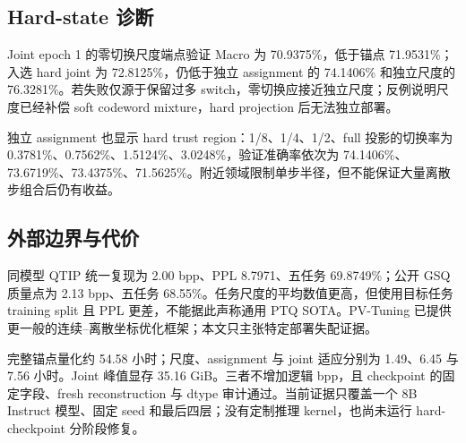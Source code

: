 \subsection{Hard-state 诊断}
Joint epoch 1 的零切换尺度端点验证 Macro 为 70.9375\%，低于锚点 71.9531\%；入选 hard joint 为 72.8125\%，仍低于独立 assignment 的 74.1406\% 和独立尺度的 76.3281\%。若失败仅源于保留过多 switch，零切换应接近独立尺度；反例说明尺度已经补偿 soft codeword mixture，hard projection 后无法独立部署。

独立 assignment 也显示 hard trust region：1/8、1/4、1/2、full 投影的切换率为 0.3781\%、0.7562\%、1.5124\%、3.0248\%，验证准确率依次为 74.1406\%、73.6719\%、73.4375\%、71.5625\%。附近领域限制单步半径，但不能保证大量离散步组合后仍有收益。

\subsection{外部边界与代价}
同模型 QTIP 统一复现为 2.00 bpp、PPL 8.7971、五任务 69.8749\%；公开 GSQ 质量点为 2.13 bpp、五任务 68.55\%。任务尺度的平均数值更高，但使用目标任务 training split 且 PPL 更差，不能据此声称通用 PTQ SOTA。PV-Tuning 已提供更一般的连续--离散坐标优化框架；本文只主张特定部署失配证据。

完整锚点量化约 54.58 小时；尺度、assignment 与 joint 适应分别为 1.49、6.45 与 7.56 小时。Joint 峰值显存 35.16 GiB。三者不增加逻辑 bpp，且 checkpoint 的固定字段、fresh reconstruction 与 dtype 审计通过。当前证据只覆盖一个 8B Instruct 模型、固定 seed 和最后四层；没有定制推理 kernel，也尚未运行 hard-checkpoint 分阶段修复。
